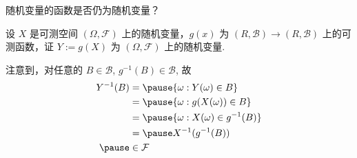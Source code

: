 \begin{frame}{随机变量的函数是否仍为随机变量？}
	\vspace{0.5cm}
	\begin{thm}
		设 $X$ 是可测空间 $(\Omega,\mathcal{F})$ 上的随机变量，$g (x)$ 为 $(R,\mathcal{B})\rightarrow (R,\mathcal{B})$ 上的可测函数，证 $Y:=g (X)$ 为 $(\Omega,\mathcal{F})$ 上的随机变量.
	\end{thm}

	\vspace{0.3cm}
	\pause
	\jieda 注意到，对任意的 $B\in \mathcal{B}$, $g^{-1}(B)\in \mathcal{B}$, 故 \pause
	\begin{align*}
		Y^{-1}(B) & =\pause \{\omega:Y(\omega)\in B\}         \\
		          & =\pause \{\omega:g(X(\omega))\in B\}      \\
		          & =\pause \{\omega:X(\omega)\in g^{-1}(B)\} \\
		          & =\pause X^{-1}(g^{-1}(B))                 \\ \pause
		          & \in  \mathcal{F}
	\end{align*}

\end{frame}


